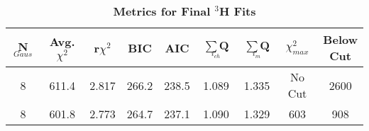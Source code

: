 
\vspace{6mm}
\begin{table}[!h]
\centering
\begin{tabular}{|c c c c c c c c c|}
\hline
\textbf{N$_{Gaus}$} & \textbf{Avg. $\chi^2$} & \textbf{r$\chi^2$} & \textbf{BIC} & \textbf{AIC} & \textbf{$\sum$Q$_{i_{ch}}$} & \textbf{$\sum$Q$_{i_{m}}$} & \textbf{$\chi^2_{max}$} & \makecell{\textbf{Below}\\ \textbf{Cut}} \\
\hline
8 & 611.4 & 2.817 & 266.2 & 238.5 & 1.089 & 1.335 & No Cut & 2600\\
8 & 601.8 & 2.773 & 264.7 & 237.1 & 1.090 & 1.329 & 603 & 908\\
\hline
\end{tabular}
\caption{\bf{Metrics for Final $^3$H Fits}}
\label{tab:3h_fits}
\end{table}

